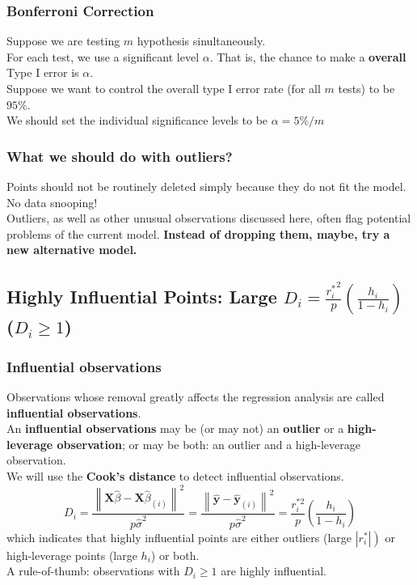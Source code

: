 \documentclass[11pt,a4paper]{article}
\begin{document}
\subsubsection{Bonferroni Correction}
Suppose we are testing $m$ hypothesis sinultaneously.\\
For each test, we use a signiﬁcant level $\alpha$. That is, the chance to make a \textbf{overall} Type I error is $\alpha$.\\
Suppose we want to control the overall type I error rate (for all $m$ tests) to be $95\%$.\\
We should set the individual signiﬁcance levels to be $\alpha = 5\%/m$
\subsubsection{What we should do with outliers?}
Points should not be routinely deleted simply because they do not ﬁt the model. No data snooping!\\
Outliers, as well as other unusual observations discussed here, often ﬂag potential problems of the current model. \textbf{Instead of dropping them, maybe, try a new alternative model.}

\subsection{Highly Inﬂuential Points: Large $D_i=\frac{{r_i^*}^2}{p}(\frac{h_i}{1-h_i})$ \quad ($D_i\geq 1$)}
\subsubsection{Inﬂuential observations}
Observations whose removal greatly aﬀects the regression analysis are called \textbf{inﬂuential observations}.\\
An \textbf{inﬂuential observations} may be (or may not) an \textbf{outlier} or a \textbf{high-leverage observation}; or may be both: an outlier and a high-leverage observation.\\
We will use the \textbf{Cook's distance} to detect influential observations.
$$
D_{i}=\frac{\left\|\mathbf{X} \hat{\beta}-\mathbf{X} \hat{\beta}_{(i)}\right\|^{2}}{p \hat{\sigma}^{2}}=\frac{\left\|\hat{\mathbf{y}}-\hat{\mathbf{y}}_{(i)}\right\|^{2}}{p \hat{\sigma}^{2}}=\frac{r_{i}^{* 2}}{p}\left(\frac{h_{i}}{1-h_{i}}\right)
$$
which indicates that highly influential points are either outliers (large $\left.\left|r_{i}^{*}\right|\right)$ or high-leverage points (large $h_{i}$) or both.\\
A rule-of-thumb: observations with $D_{i} \geq 1$ are highly influential.
\end{document}

